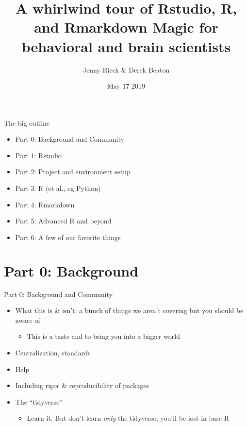 \documentclass[ignorenonframetext,]{beamer}
\title{A whirlwind tour of Rstudio, R, and Rmarkdown Magic for behavioral and
brain scientists}
\author{Jenny Rieck \& Derek Beaton}
\date{May 17 2019}
\providecommand{\tightlist}{%
  \setlength{\itemsep}{0pt}\setlength{\parskip}{0pt}}
\begin{document}
\frame{\titlepage}

\begin{frame}{The big outline}
\protect\hypertarget{the-big-outline}{}

\begin{itemize}
\tightlist
\item
  Part 0: Background and Community
\item
  Part 1: Rstudio
\item
  Part 2: Project and environment setup
\item
  Part 3: R (et al., eg Python)
\item
  Part 4: Rmarkdown
\item
  Part 5: Advanced R and beyond
\item
  Part 6: A few of our favorite things
\end{itemize}

\end{frame}

\hypertarget{part-0-background}{%
\section{Part 0: Background}\label{part-0-background}}

\begin{frame}{Part 0: Background and Community}
\protect\hypertarget{part-0-background-and-community}{}

\begin{itemize}
\tightlist
\item
  What this is \& isn't; a bunch of things we aren't covering but you
  should be aware of

  \begin{itemize}
  \tightlist
  \item
    This is a taste and to bring you into a bigger world
  \end{itemize}
\item
  Centralization, standards
\item
  Help
\item
  Including rigor \& reproducibility of packages
\item
  The ``tidyverse''

  \begin{itemize}
  \tightlist
  \item
    Learn it. But don't learn \emph{only} the tidyverse; you'll be lost
    in base R
  \end{itemize}
\end{itemize}

\end{frame}
\end{document}
